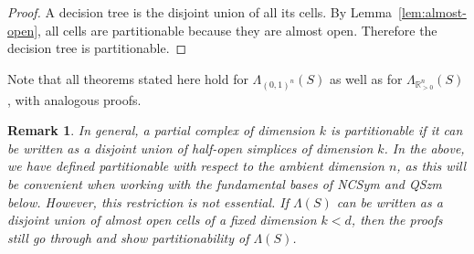 \documentclass[12pt,reqno]{amsart}
\numberwithin{definition}{section}
\newtheorem{remark}[definition]{Remark}
\theoremstyle{definition}
\newtheorem{example}[definition]{Example}
\newcommand{\RR}{\mathbb{R}}
\newcommand{\allow}{\Lambda} %
\newcommand{\allowP}{\allow_{\RR^n_{> 0}}} %
\newcommand{\allowC}{\allow_{(0,1)^n}} %
\begin{document}
\begin{proof} 
A decision tree is the disjoint union of all its cells. By Lemma~\ref{lem:almost-open}, all cells are partitionable because they are almost open. Therefore the decision tree is partitionable.
\end{proof}

Note that all theorems stated here hold for $\allowC(S)$ as well as for $\allowP(S)$, with analogous proofs.

\begin{remark}
In general, a partial complex of dimension $k$ is partitionable if it can be written as a disjoint union of half-open simplices of dimension $k$. In the above, we have defined partitionable with respect to the ambient dimension $n$, as this will be convenient when working with the fundamental bases of NCSym and QSzm below. However, this restriction is not essential. If $\allow(S)$ can be written as a disjoint union of almost open cells of a fixed dimension $k<d$, then the proofs still go through and show partitionability of $\allow(S)$.
\end{remark}


\end{document}
